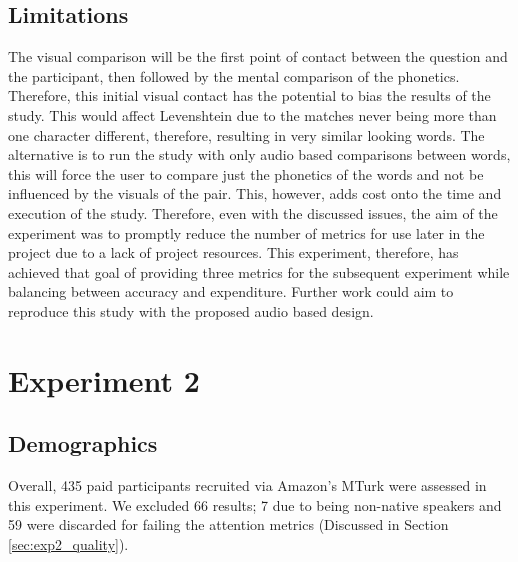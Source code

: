 \subsection{Limitations}

The visual comparison will be the first point of contact between the question and the participant, then followed by the mental comparison of the phonetics. Therefore, this initial visual contact has the potential to bias the results of the study. This would affect Levenshtein due to the matches never being more than one character different, therefore, resulting in very similar looking words.
The alternative is to run the study with only audio based comparisons between words, this will force the user to compare just the phonetics of the words and not be influenced by the visuals of the pair. This, however, adds cost onto the time and execution of the study. Therefore, even with the discussed issues, the aim of the experiment was to promptly reduce the number of metrics for use later in the project due to a lack of project resources. This experiment, therefore, has achieved that goal of providing three metrics for the subsequent experiment while balancing between accuracy and expenditure. Further work could aim to reproduce this study with the proposed audio based design.



\newpage

\section{Experiment 2}

\subsection*{Demographics}
Overall, 435 paid participants recruited via Amazon's MTurk were assessed in this experiment. We excluded 66 results; 7 due to being non-native speakers and 59 were discarded for failing the attention metrics (Discussed in Section \ref{sec:exp2_quality}).

